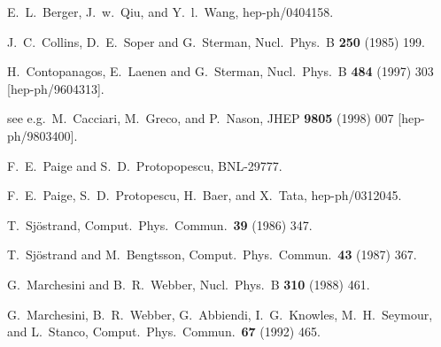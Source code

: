 \begin{thebibliography}{999}
E.~L.~Berger, J.~w.~Qiu, and Y.~l.~Wang,
hep-ph/0404158.


J.~C.~Collins, D.~E.~Soper and G.~Sterman,
Nucl.\ Phys.\ B {\bf 250} (1985) 199.

H.~Contopanagos, E.~Laenen and G.~Sterman,
Nucl.\ Phys.\ B {\bf 484} (1997) 303
[hep-ph/9604313].

see e.g.\ M.~Cacciari, M.~Greco, and P.~Nason,
JHEP {\bf 9805} (1998) 007
[hep-ph/9803400].

F.~E.~Paige and S.~D.~Protopopescu,
BNL-29777.

F.~E.~Paige, S.~D.~Protopescu, H.~Baer, and X.~Tata,
hep-ph/0312045.

T.~Sj\"ostrand,
Comput.\ Phys.\ Commun.\  {\bf 39} (1986) 347.

T.~Sj\"ostrand and M.~Bengtsson,
Comput.\ Phys.\ Commun.\  {\bf 43} (1987) 367.

G.~Marchesini and B.~R.~Webber,
Nucl.\ Phys.\ B {\bf 310} (1988) 461.

G.~Marchesini, B.~R.~Webber, G.~Abbiendi, I.~G.~Knowles, M.~H.~Seymour,
and L.~Stanco,
Comput.\ Phys.\ Commun.\  {\bf 67} (1992) 465.


\end{thebibliography}
